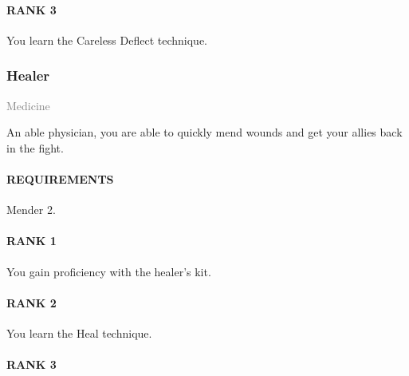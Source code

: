 \paragraph{RANK 3} You learn the Careless Deflect technique.


\subsubsection{Healer} \label{feat::healer}
\small{\textcolor{gray}{Medicine}}

\normalsize
An able physician, you are able to quickly mend wounds and get your allies back in the fight.
\paragraph{REQUIREMENTS} Mender 2.
\paragraph{RANK 1} You gain proficiency with the healer's kit.
\paragraph{RANK 2} You learn the Heal technique.
\paragraph{RANK 3}

